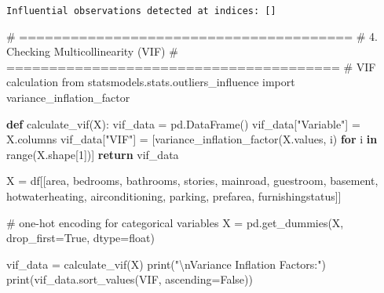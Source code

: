 \documentclass[
  letterpaper,
  DIV=11,
  numbers=noendperiod]{scrreprt}
\newenvironment{Shaded}{\begin{snugshade}}{\end{snugshade}}
\newcommand{\BuiltInTok}[1]{\textcolor[rgb]{0.00,0.23,0.31}{#1}}
\newcommand{\CharTok}[1]{\textcolor[rgb]{0.13,0.47,0.30}{#1}}
\newcommand{\CommentTok}[1]{\textcolor[rgb]{0.37,0.37,0.37}{#1}}
\newcommand{\ControlFlowTok}[1]{\textcolor[rgb]{0.00,0.23,0.31}{\textbf{#1}}}
\newcommand{\DecValTok}[1]{\textcolor[rgb]{0.68,0.00,0.00}{#1}}
\newcommand{\ImportTok}[1]{\textcolor[rgb]{0.00,0.46,0.62}{#1}}
\newcommand{\KeywordTok}[1]{\textcolor[rgb]{0.00,0.23,0.31}{\textbf{#1}}}
\newcommand{\NormalTok}[1]{\textcolor[rgb]{0.00,0.23,0.31}{#1}}
\newcommand{\OperatorTok}[1]{\textcolor[rgb]{0.37,0.37,0.37}{#1}}
\newcommand{\StringTok}[1]{\textcolor[rgb]{0.13,0.47,0.30}{#1}}
\newcommand{\VariableTok}[1]{\textcolor[rgb]{0.07,0.07,0.07}{#1}}
\begin{document}
\begin{verbatim}
Influential observations detected at indices: []
\end{verbatim}

\begin{Shaded}
\begin{Highlighting}[]
\CommentTok{\# =======================================}
\CommentTok{\# 4. Checking Multicollinearity (VIF)}
\CommentTok{\# =======================================}
\CommentTok{\# VIF calculation}
\ImportTok{from}\NormalTok{ statsmodels.stats.outliers\_influence }\ImportTok{import}\NormalTok{ variance\_inflation\_factor}

\KeywordTok{def}\NormalTok{ calculate\_vif(X):}
\NormalTok{    vif\_data }\OperatorTok{=}\NormalTok{ pd.DataFrame()}
\NormalTok{    vif\_data[}\StringTok{"Variable"}\NormalTok{] }\OperatorTok{=}\NormalTok{ X.columns}
\NormalTok{    vif\_data[}\StringTok{"VIF"}\NormalTok{] }\OperatorTok{=}\NormalTok{ [variance\_inflation\_factor(X.values, i) }\ControlFlowTok{for}\NormalTok{ i }\KeywordTok{in} \BuiltInTok{range}\NormalTok{(X.shape[}\DecValTok{1}\NormalTok{])]}
    \ControlFlowTok{return}\NormalTok{ vif\_data}

\NormalTok{X }\OperatorTok{=}\NormalTok{ df[[}\StringTok{\textquotesingle{}area\textquotesingle{}}\NormalTok{, }\StringTok{\textquotesingle{}bedrooms\textquotesingle{}}\NormalTok{, }\StringTok{\textquotesingle{}bathrooms\textquotesingle{}}\NormalTok{, }\StringTok{\textquotesingle{}stories\textquotesingle{}}\NormalTok{, }\StringTok{\textquotesingle{}mainroad\textquotesingle{}}\NormalTok{, }\StringTok{\textquotesingle{}guestroom\textquotesingle{}}\NormalTok{, }\StringTok{\textquotesingle{}basement\textquotesingle{}}\NormalTok{, }\StringTok{\textquotesingle{}hotwaterheating\textquotesingle{}}\NormalTok{, }\StringTok{\textquotesingle{}airconditioning\textquotesingle{}}\NormalTok{, }\StringTok{\textquotesingle{}parking\textquotesingle{}}\NormalTok{, }\StringTok{\textquotesingle{}prefarea\textquotesingle{}}\NormalTok{, }\StringTok{\textquotesingle{}furnishingstatus\textquotesingle{}}\NormalTok{]]}

\CommentTok{\# one{-}hot encoding for categorical variables}
\NormalTok{X }\OperatorTok{=}\NormalTok{ pd.get\_dummies(X, drop\_first}\OperatorTok{=}\VariableTok{True}\NormalTok{, dtype}\OperatorTok{=}\BuiltInTok{float}\NormalTok{)}


\NormalTok{vif\_data }\OperatorTok{=}\NormalTok{ calculate\_vif(X)}
\BuiltInTok{print}\NormalTok{(}\StringTok{"}\CharTok{\textbackslash{}n}\StringTok{Variance Inflation Factors:"}\NormalTok{)}
\BuiltInTok{print}\NormalTok{(vif\_data.sort\_values(}\StringTok{\textquotesingle{}VIF\textquotesingle{}}\NormalTok{, ascending}\OperatorTok{=}\VariableTok{False}\NormalTok{))}
\end{Highlighting}
\end{Shaded}
\end{document}
